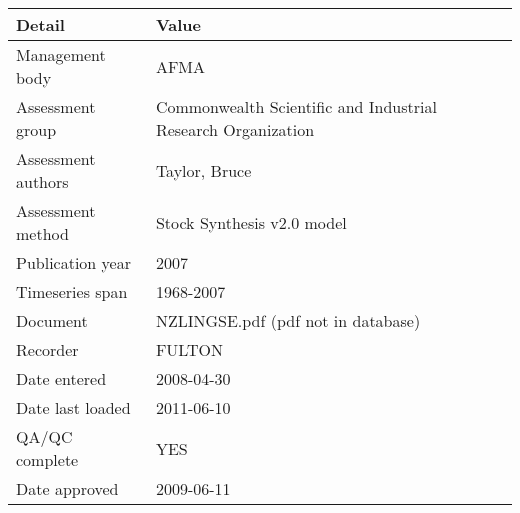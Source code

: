 \begin{table}[htb]
\centering
\begin{tabular}{lp{7cm}}
\toprule
Detail & Value \\
\midrule
Management body    & AFMA                                                         \\
Assessment group   & Commonwealth Scientific and Industrial Research Organization \\
Assessment authors & Taylor, Bruce                                                \\
Assessment method  & Stock Synthesis v2.0 model                                   \\
Publication year   & 2007                                                         \\
Timeseries span    & 1968-2007                                                    \\
Document           & NZLINGSE.pdf (pdf not in database)                           \\
Recorder           & FULTON                                                       \\
Date entered       & 2008-04-30                                                   \\
Date last loaded   & 2011-06-10                                                   \\
QA/QC complete     & YES                                                          \\
Date approved      & 2009-06-11                                                   \\
\bottomrule
\end{tabular}
\label{tab:assessdet}
\end{table}

